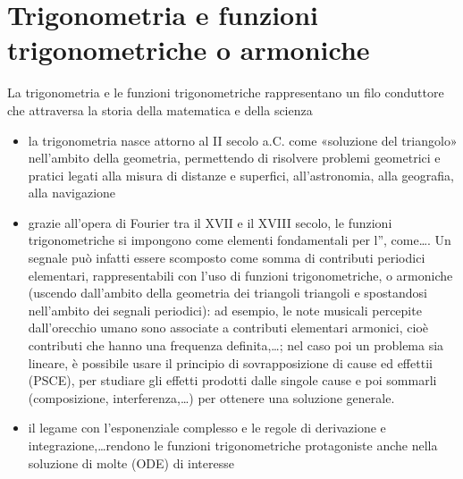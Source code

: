 \documentclass[letterpaper,10pt,italian]{jupyterBook}
\begin{document}
\chapter{Trigonometria e funzioni trigonometriche \sphinxhyphen{} o armoniche}
\label{\detokenize{ch/trigonometry:trigonometria-e-funzioni-trigonometriche-o-armoniche}}\label{\detokenize{ch/trigonometry:math-hs-trigonometry}}\label{\detokenize{ch/trigonometry::doc}}
\sphinxAtStartPar
{} La trigonometria e le funzioni trigonometriche rappresentano un filo conduttore che attraversa la storia della matematica e della scienza
\begin{itemize}
\item {} 
\sphinxAtStartPar
la trigonometria nasce attorno al II secolo a.C. come «soluzione del triangolo» nell’ambito della geometria, permettendo di risolvere problemi geometrici e pratici legati alla misura di distanze e superfici, all’astronomia, alla geografia, alla navigazione

\item {} 
\sphinxAtStartPar
grazie all’opera di Fourier tra il XVII e il XVIII secolo, le funzioni trigonometriche si impongono come elementi fondamentali per l”, come…. Un segnale può infatti essere scomposto come somma di contributi periodici elementari, rappresentabili con l’uso di funzioni trigonometriche, o armoniche (uscendo dall’ambito della geometria dei triangoli triangoli e spostandosi nell’ambito dei segnali periodici): ad esempio, le note musicali percepite dall’orecchio umano sono associate a contributi elementari armonici, cioè contributi che hanno una frequenza definita,…; nel caso poi un problema sia lineare, è possibile usare il principio di sovrapposizione di cause ed effettii (PSCE), per studiare gli effetti prodotti dalle singole cause e poi sommarli (composizione, interferenza,…) per ottenere una soluzione generale.

\item {} 
\sphinxAtStartPar
il legame con l’esponenziale complesso e le regole di derivazione e integrazione,…rendono le funzioni trigonometriche protagoniste anche nella soluzione di molte  (ODE) di interesse

\end{itemize}

\sphinxAtStartPar
{} {\hyperref[\detokenize{ch/todo:math-hs-todo-fourier}]{}}
\end{document}

